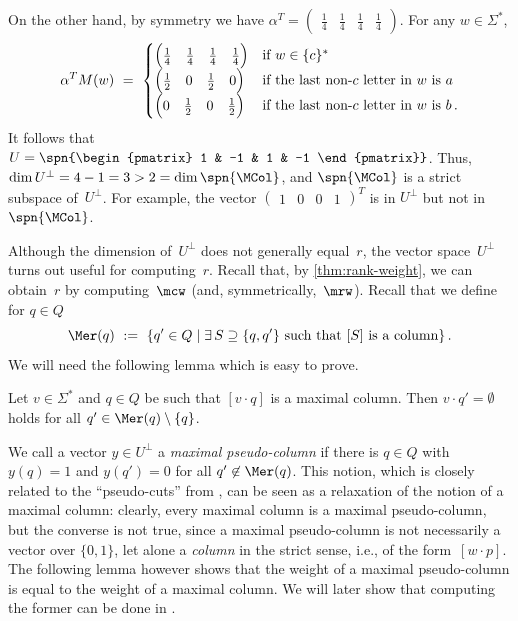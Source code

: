 \begin{exa}
On the other hand, by symmetry we have $\alpha^T = \begin{pmatrix} \frac14 & \frac14 & \frac14 & \frac14 \end{pmatrix}$.
For any $w \in \Sigma^*$,
\[
\alpha^T M(w) \ = \ \begin{cases}
 \begin{pmatrix} \frac14 & \frac14 & \frac14 & \frac14 \end{pmatrix} & \text{if } w \in \{c\}^* \\
 \begin{pmatrix} \frac12 & 0 & \frac12 & 0 \end{pmatrix} & \text{if the last non-$c$ letter in $w$ is $a$} \\
 \begin{pmatrix} 0 & \frac12 & 0 & \frac12 \end{pmatrix} & \text{if the last non-$c$ letter in $w$ is $b$\,.}
\end{cases}
\]
It follows that $U = \spn{\begin{pmatrix} 1 & -1 & 1 & -1 \end{pmatrix}}$.
Thus, $\dim U^\bot = 4 - 1 = 3 > 2 = \dim \spn{\MCol}$, and $\spn{\MCol}$ is a strict subspace of~$U^\bot$.
For example, the vector $\begin{pmatrix} 1 & 0 & 0 & 1 \end{pmatrix}^T$ is in $U^\bot$ but not in $\spn{\MCol}$.
\end{exa}

\noindent
Although the dimension of~$U^\bot$ does not generally equal~$r$, the vector space~$U^\bot$ turns out useful for computing~$r$.
Recall that, by \autoref{thm:rank-weight}, we can obtain~$r$ by computing~$\mcw$ (and, symmetrically,~$\mrw$). Recall that we define for $q \in Q$
\[
 \Mer(q) \ := \ \{q' \in Q \mid \exists\,S \supseteq \{q,q'\} \text{ such that } [S] \text{ is a column}\}\,.
\]
We will need the following lemma which is easy to prove.

\begin{lem}\label{lem:max-column-body}
Let $v \in \Sigma^*$ and $q \in Q$ be such that $[v \cdot q]$ is a maximal column. Then $v \cdot q' = \emptyset$ holds for all $q' \in \Mer(q) \setminus \{q\}$.
\end{lem}

\noindent
We call a vector $y \in U^\bot$ a \emph{maximal pseudo-column} if there is $q \in Q$ with $y(q) = 1$ and $y(q') = 0$ for all $q' \not\in \Mer(q)$.
This notion, which is closely related to the ``pseudo-cuts'' from \cite{KieferW19}, can be seen as a relaxation of the notion of a maximal column: clearly, every maximal column is a maximal pseudo-column, but the converse is not true, since a maximal pseudo-column is not necessarily a vector over $\{0, 1\}$, let alone a \emph{column} in the strict sense, i.e., of the form~$[w \cdot p]$. The following lemma however shows that the weight of a maximal pseudo-column is equal to the weight of a maximal column. We will later show that computing the former can be done in \NCT.



